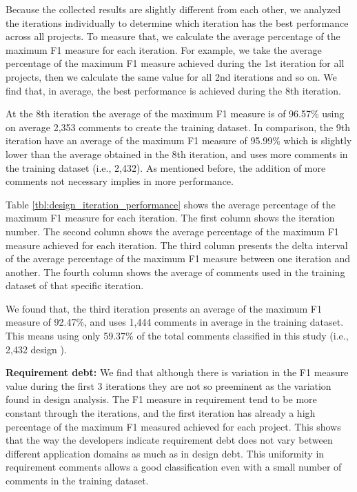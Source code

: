 Because the collected results are slightly different from each other, we analyzed the iterations individually to determine which iteration has the best performance across all projects. To measure that, we calculate the average percentage of the maximum F1 measure for each iteration. For example, we take the average percentage of the maximum F1 measure achieved during the 1st iteration for all projects, then we calculate the same value for all 2nd iterations and so on. We find that, in average, the best performance is achieved during the 8th iteration.

At the 8th iteration the average of the maximum F1 measure is of 96.57\% using on average 2,353 comments to create the training dataset. In comparison, the 9th iteration have an average of the maximum F1 measure of 95.99\% which is slightly lower than the average obtained in the 8th iteration, and uses more comments in the training dataset (i.e., 2,432). As mentioned before, the addition of more comments not necessary implies in more performance.

Table \ref{tbl:design_iteration_performance} shows the average percentage of the maximum F1 measure for each iteration. The first column shows the iteration number. The second column shows the average percentage of the maximum F1 measure achieved for each iteration. The third column presents the delta interval of the average percentage of the maximum F1 measure between one iteration and another. The fourth column shows the average of comments used in the training dataset of that specific iteration.

We found that, the third iteration presents an average of the maximum F1 measure of 92.47\%, and uses 1,444 comments in average in the training dataset. This means using only 59.37\% of the total comments classified in this study (i.e., 2,432 design \SATD). 

\vspace{1mm}
\noindent \textbf{Requirement debt:} We find that although there is variation in the F1 measure value during the first 3 iterations they are not so preeminent as the variation found in design \SATD analysis. The F1 measure in requirement \SATD tend to be more constant through the iterations, and the first iteration has already a high percentage of the maximum F1 measured achieved for each project. This shows that the way the developers indicate requirement debt does not vary between different application domains as much as in design debt. This uniformity in requirement \SATD comments allows a good classification even with a small number of comments in the training dataset.  

